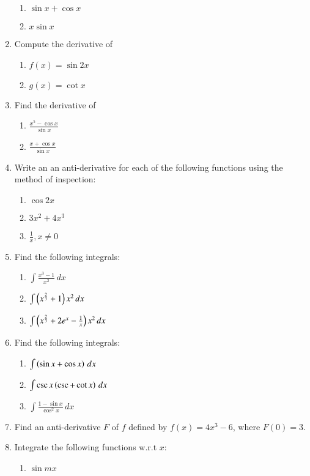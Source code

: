 \begin{enumerate}[label=\arabic*.,ref=\thesubsection.\theenumi]
%
\begin{enumerate}
\item  $\sin x + \cos x$
\item  $x \sin x$
\end{enumerate}
%
\item Compute the derivative of 
%
\begin{enumerate}
\item  $f(x) = \sin 2x$
\item  $g(x) = \cot x$
\end{enumerate}
%
\item Find the derivative of 
%
\begin{enumerate}
\item  $\frac{x^5-\cos x}{\sin x}$
\item  $\frac{x+\cos x}{\sin x}$
\end{enumerate}
%
\item Write an an anti-derivative for each of the following functions using the method of inspection:
\begin{enumerate}
%
\item  $\cos 2x$
\item  $3x^2+4x^3$
\item  $\frac{1}{x}, x \ne 0$
%
\end{enumerate}
\item Find the following integrals:
\begin{enumerate}
%
\item  $\int \frac{x^3-1}{x^2}\, dx$
\item  $\int \left(x^{\frac{2}{3}}+1\right){x^2}\, dx$
\item  $\int \left(x^{\frac{2}{3}}+2e^x - \frac{1}{x}\right){x^2}\, dx$
\end{enumerate}
%
\item Find the following integrals:
\begin{enumerate}
%
\item  $\int \left(\sin x + \cos x\right) \, dx$
\item  $\int \csc x\left(\csc  + \cot x\right) \, dx$
\item  $\int \frac{1-\sin x}{ \cos^2 x} \, dx$
%
\end{enumerate}
%
\item Find an anti-derivative $F$ of $f$ defined by $f(x) = 4x^3-6$, where $F(0) = 3$.
%
\item Integrate the following functions w.r.t $x$:
\begin{enumerate}
%
\item  $\sin mx$

\end{enumerate}
\end{enumerate}

